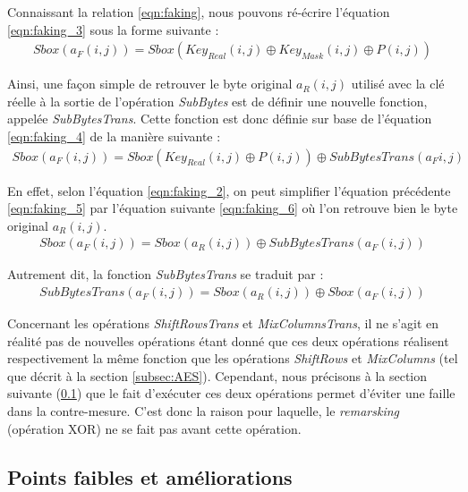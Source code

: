 \documentclass[oneside]{book}
\begin{document}
\hspace{-0.5cm}Connaissant la relation \ref{eqn:faking}, nous pouvons ré-écrire l'équation \ref{eqn:faking_3} sous la forme suivante : 
\begin{gather}
	Sbox(a_{F}(i,j)) = Sbox(Key_{Real}(i,j) \oplus Key_{Mask}(i,j) \oplus P(i,j))\label{eqn:faking_4}
\end{gather}

\hspace{-0.5cm}Ainsi, une façon simple de retrouver le byte original $a_{R}(i,j)$ utilisé avec la clé réelle à la sortie de l'opération \textit{SubBytes} est de définir une nouvelle fonction, appelée \textit{SubBytesTrans}. Cette fonction est donc définie sur base de l'équation \ref{eqn:faking_4} de la manière suivante : 
\begin{gather}
	Sbox(a_{F}(i,j)) = Sbox(Key_{Real}(i,j) \oplus P(i,j)) \oplus SubBytesTrans(a_{F}i,j)\label{eqn:faking_5}
\end{gather}

\hspace{-0.5cm}En effet, selon l'équation \ref{eqn:faking_2}, on peut simplifier l'équation précédente \ref{eqn:faking_5} par l'équation suivante \ref{eqn:faking_6} où l'on retrouve bien le byte original $a_{R}(i,j)$.
\begin{gather}
	Sbox(a_{F}(i,j)) = Sbox(a_{R}(i,j)) \oplus SubBytesTrans(a_{F}(i,j))\label{eqn:faking_6}
\end{gather}

\hspace{-0.5cm}Autrement dit, la fonction \textit{SubBytesTrans} se traduit par :
\begin{gather}
	SubBytesTrans(a_{F}(i,j)) = Sbox(a_{R}(i,j))  \oplus Sbox(a_{F}(i,j)) \label{eqn:faking_7}
\end{gather}

\hspace{-0.5cm}Concernant les opérations \textit{ShiftRowsTrans} et \textit{MixColumnsTrans}, il ne s'agit en réalité pas de nouvelles opérations étant donné que ces deux opérations réalisent respectivement la même fonction que les opérations \textit{ShiftRows} et \textit{MixColumns} (tel que décrit à la section \ref{subsec:AES}). Cependant, nous précisons à la section suivante (\ref{subsec:points}) que le fait d'exécuter ces deux opérations permet d'éviter une faille dans la contre-mesure. C'est donc la raison pour laquelle, le \textit{remarsking} (opération XOR) ne se fait pas avant cette opération.

\subsection{Points faibles et améliorations}
\label{subsec:points}
\end{document}
